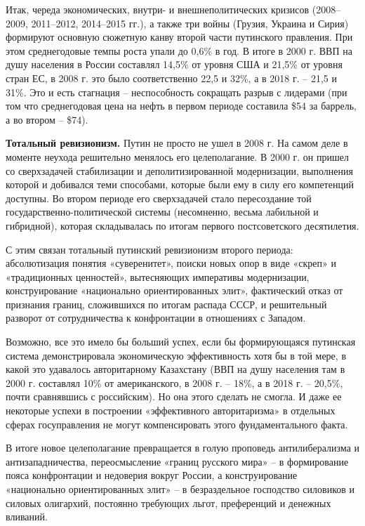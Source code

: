 Итак, череда экономических, внутри- и внешнеполитических кризисов (2008–2009, 2011–2012, 2014–2015 гг.), а также три войны (Грузия, Украина и Сирия) формируют основную сюжетную канву второй части путинского правления. При этом среднегодовые темпы роста упали до 0,6\% в год. В итоге в 2000 г. ВВП на душу населения в России составлял 14,5\% от уровня США и 21,5\% от уровня стран ЕС, в 2008 г. это было соответственно 22,5 и 32\%, а в 2018 г. – 21,5 и 31\%. Это и есть стагнация – неспособность сокращать разрыв с лидерами (при том что среднегодовая цена на нефть в первом периоде составила \$54 за баррель, а во втором – \$74).

\textbf{Тотальный ревизионизм.}
Путин не просто не ушел в 2008 г. На самом деле в моменте неухода решительно менялось его целеполагание. В 2000 г. он пришел со сверхзадачей стабилизации и деполитизированной модернизации, выполнения которой и добивался теми способами, которые были ему в силу его компетенций доступны. Во втором периоде его сверхзадачей стало пересоздание той государственно-политической системы (несомненно, весьма лабильной и гибридной), которая складывалась по итогам первого постсоветского десятилетия.

С этим связан тотальный путинский ревизионизм второго периода: абсолютизация понятия «суверенитет», поиски новых опор в виде «скреп» и «традиционных ценностей», вытесняющих императивы модернизации, конструирование «национально ориентированных элит», фактический отказ от признания границ, сложившихся по итогам распада СССР, и решительный разворот от сотрудничества к конфронтации в отношениях с Западом.

Возможно, все это имело бы больший успех, если бы формирующаяся путинская система демонстрировала экономическую эффективность хотя бы в той мере, в какой это удавалось авторитарному Казахстану (ВВП на душу населения там в 2000 г. составлял 10\% от американского, в 2008 г. – 18\%, а в 2018 г. – 20,5\%, почти сравнявшись с российским). Но она этого сделать не смогла. И даже ее некоторые успехи в построении «эффективного авторитаризма» в отдельных сферах госуправления не могут компенсировать этого фундаментального факта.

В итоге новое целеполагание превращается в голую проповедь антилиберализма и антизападничества, переосмысление «границ русского мира» – в формирование пояса конфронтации и недоверия вокруг России, а конструирование «национально ориентированных элит» – в безраздельное господство силовиков и силовых олигархий, постоянно требующих льгот, преференций и денежных вливаний.

